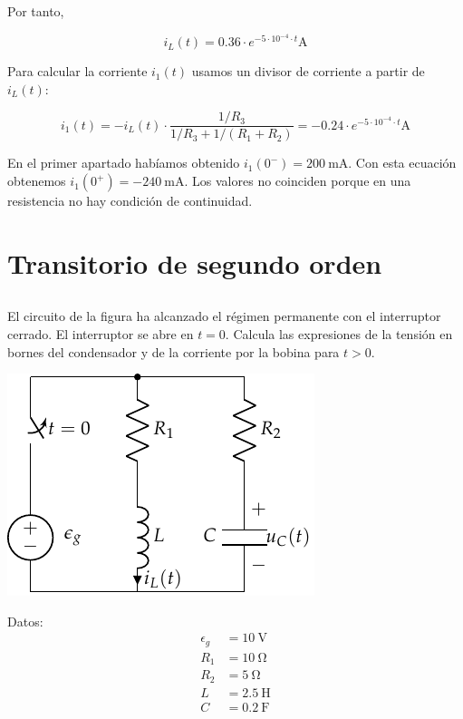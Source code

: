 \documentclass[12pt]{article}
\begin{document}
Por tanto,

\begin{equation*}
  i_L(t) = 0.36 \cdot e^{-5 \cdot 10^{-4} \cdot t}\si{\ampere}
\end{equation*}

Para calcular la corriente $i_1(t)$ usamos un divisor de corriente a
partir de $i_L(t)$:

\begin{equation*}
  i_1(t) = -i_L(t) \cdot \frac{1/R_3}{1/R_3 + 1/(R_1 + R_2)} = -0.24 \cdot e^{-5 \cdot 10^{-4} \cdot t}\si{\ampere}
\end{equation*}

En el primer apartado habíamos obtenido
$i_1(0^-) = \SI{200}{\milli\ampere}$. Con esta ecuación obtenemos
$i_1(0^+) = -\SI{240}{\milli\ampere}$. Los valores no coinciden porque
en una resistencia no hay condición de continuidad.

\clearpage

\section{Transitorio de segundo orden}

\subsection{}

El circuito de la figura ha alcanzado el régimen permanente con el
interruptor cerrado. El interruptor se abre en $t = 0$. Calcula las
expresiones de la tensión en bornes del condensador y de la corriente
por la bobina para $t > 0$.

\vspace*{1cm}

\begin{minipage}{0.7\textwidth}
  \includegraphics[scale=0.95]{figs/FM_4_8}
\end{minipage}
\hfill
\begin{minipage}{0.3\textwidth}
  Datos:
  \begin{align*}
    \epsilon_g &= \SI{10}{\volt}\\
    R_1 &= \SI{10}{\ohm}\\
    R_2 &= \SI{5}{\ohm}\\
    L &= \SI{2.5}{\henry}\\
    C &= \SI{0.2}{\farad}      
  \end{align*}
\end{minipage}
\end{document}
